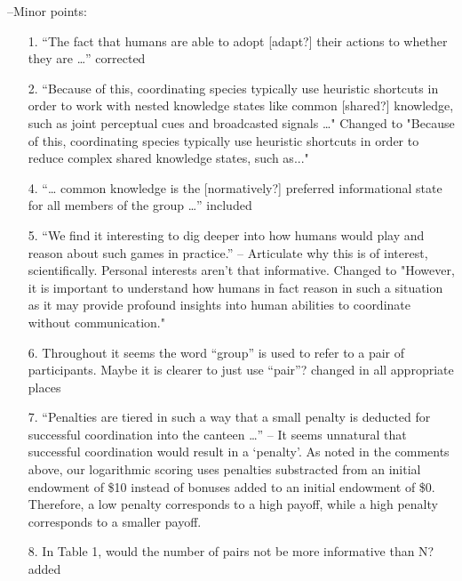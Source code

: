 \documentclass{article}
\newenvironment{response}{\smallskip \noindent \color{blue}}{\color{black}\smallskip}
\begin{document}
--Minor points:
\begin{enumerate}
   \item[1.]    “The fact that humans are able to adopt [adapt?] their actions to whether they are …” \begin{response} corrected \end{response}
   \item[2.]    “Because of this, coordinating species typically use heuristic shortcuts in order to work with nested knowledge states like common [shared?] knowledge, such as joint perceptual cues and broadcasted signals …" \begin{response}Changed to "Because of this, coordinating species typically use heuristic shortcuts in order to reduce complex shared knowledge states, such as..."\end{response}
  \item[4.]    “… common knowledge is the [normatively?] preferred informational state for all members of the group …” \begin{response}included\end{response}
  \item[5.]    “We find it interesting to dig deeper into how humans would play and reason about such games in practice.” – Articulate why this is of interest, scientifically. Personal interests aren’t that informative. \begin{response}Changed to "However, it is important to understand how humans in fact reason in such a situation as it may provide profound insights into human abilities to coordinate without communication." \end{response}
  \item[6.]    Throughout it seems the word “group” is used to refer to a pair of participants. Maybe it is clearer to just use “pair”?  \begin{response}changed in all appropriate places\end{response}
  \item[7.]    “Penalties are tiered in such a way that a small penalty is deducted for successful coordination into the canteen …” – It seems unnatural that successful coordination would result in a ‘penalty’.  \begin{response}As noted in the comments above, our logarithmic scoring uses penalties substracted from an initial endowment of \$10 instead of bonuses added to an initial endowment of \$0. Therefore, a low penalty corresponds to a high payoff, while a high penalty corresponds to a smaller payoff.\end{response}
  \item[8.]    In Table 1, would the number of pairs not be more informative than N? \begin{response}added\end{response}
\end{enumerate}  
\end{document}
